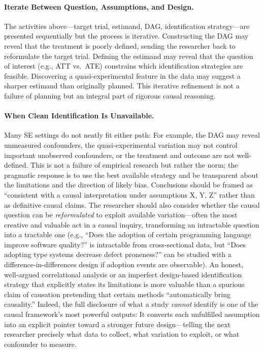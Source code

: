 \paragraph{Iterate Between Question, Assumptions, and Design.}
The activities above---target trial, estimand, DAG, identification strategy---are presented sequentially but the process is iterative.
Constructing the DAG may reveal that the treatment is poorly defined, sending the researcher back to reformulate the target trial.
Defining the estimand may reveal that the question of interest (e.g., ATT vs.\ ATE) constrains which identification strategies are feasible.
Discovering a quasi-experimental feature in the data may suggest a sharper estimand than originally planned.
This iterative refinement is not a failure of planning but an integral part of rigorous causal reasoning.

\paragraph{When Clean Identification Is Unavailable.}
\label{sec:guide-neither}
Many SE settings do not neatly fit either path: For example, the DAG may reveal unmeasured confounders, the quasi-experimental variation may not control important unobserved confounders, or the treatment and outcome are not well-defined.
This is not a failure of empirical research but rather the norm; the pragmatic response is to use the best available strategy and be transparent about the limitations and the direction of likely bias.
Conclusions should be framed as ``consistent with a causal interpretation under assumptions X, Y, Z'' rather than as definitive causal claims.
The researcher should also consider whether the causal question can be \emph{reformulated} to exploit available variation---often the most creative and valuable act in a causal inquiry, transforming an intractable question into a tractable one (e.g., ``Does the adoption of certain programming language improve software quality?'' is intractable from cross-sectional data, but ``Does adopting type systems decrease defect proneness?'' can be studied with a difference-in-differences design if adoption events are observable).
An honest, well-argued correlational analysis or an imperfect design-based identification strategy that explicitly states its limitations is more valuable than a spurious claim of causation pretending that certain methods ``automatically bring causality.''
Indeed, the full disclosure of what a study \emph{cannot} identify is one of the causal framework's most powerful outputs: It converts each unfulfilled assumption into an explicit pointer toward a stronger future design---telling the next researcher precisely what data to collect, what variation to exploit, or what confounder to measure.

